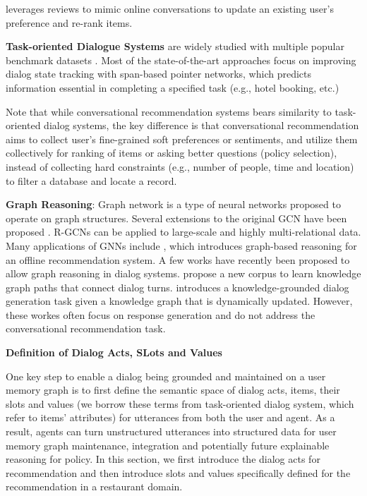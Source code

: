 \cite{zhang2018towards} leverages reviews to mimic online conversations to update an existing user's preference and re-rank items.

\noindent \textbf{Task-oriented Dialogue Systems} are widely studied with multiple popular benchmark datasets \cite{dstc2, woz, multiwoz, multiwoz2.1,sgd-dst}.
Most of the state-of-the-art approaches \cite{trade,bert-dst-alexa,bert-dst-cmu} focus on improving dialog state tracking with span-based pointer networks, which predicts information essential in completing a specified task (e.g., hotel booking, etc.)

Note that while conversational recommendation systems bears similarity to task-oriented dialog systems, the key difference is that conversational recommendation aims to collect user's fine-grained soft preferences or sentiments, and utilize them collectively for ranking of items or asking better questions (policy selection), instead of collecting hard constraints (e.g., number of people, time and location) to filter a database and locate a record. 

\noindent \textbf{Graph Reasoning}:
Graph network \cite{scarselli2008graph,duvenaud2015convolutional,defferrard2016convolutional,kipf2016semi} is a type of neural networks proposed to operate on graph structures. 
Several extensions to the original GCN have been proposed \cite{li2015gated,pham2017column}.
R-GCNs \cite{schlichtkrull2018modeling} can be applied to large-scale and highly multi-relational data.
Many applications of GNNs include \cite{Xian2019ReinforcementKG}, which introduces graph-based reasoning for an offline recommendation system.
A few works have recently been proposed to allow graph reasoning in dialog systems.
\cite{Moon+19a, Moon+19b} propose a new corpus to learn knowledge graph paths that connect dialog turns.
\cite{tuan-etal-2019-dykgchat} introduces a knowledge-grounded dialog generation task given a knowledge graph that is dynamically updated.
However, these workes often focus on response generation and do not address the conversational recommendation task.


\textbf{Definition of Dialog Acts, SLots and Values}

\label{chap6:sec:form}
One key step to enable a dialog being grounded and maintained on a user memory graph is to first define the semantic space of dialog acts, items, their slots and values (we borrow these terms from task-oriented dialog system, which refer to items' attributes) for utterances from both the user and agent.
As a result, agents can turn unstructured utterances into structured data for user memory graph maintenance, integration and potentially future explainable reasoning for policy.
In this section, we first introduce the dialog acts for recommendation and then introduce slots and values specifically defined for the recommendation in a restaurant domain.

